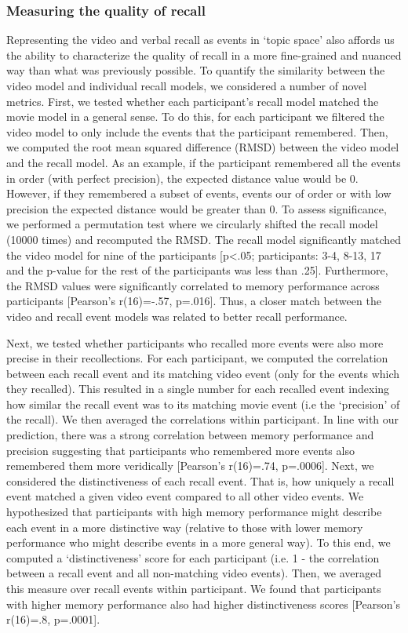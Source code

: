 \documentclass{article}
\begin{document}
{\subsubsection{Measuring the quality of recall}
Representing the video and verbal recall as events in `topic space' also affords us the ability to characterize the quality of recall in a more fine-grained and nuanced way than what was previously possible. To quantify the similarity between the video model and individual recall models, we considered a number of novel metrics.  First, we tested whether each participant's recall model matched the movie model in a general sense. To do this, for each participant we filtered the video model to only include the events that the participant remembered. Then, we computed the root mean squared difference (RMSD) between the video model and the recall model. As an example, if the participant remembered all the events in order (with perfect precision), the expected distance value would be 0. However, if they remembered a subset of events, events our of order or with low precision the expected distance would be greater than 0. To assess significance, we performed a permutation test where we circularly shifted the recall model (10000 times) and recomputed the RMSD. The recall model significantly matched the video model for nine of the participants [p<.05; participants: 3-4, 8-13, 17 and the p-value for the rest of the participants was less than .25]. Furthermore, the RMSD values were significantly correlated to memory performance across participants [Pearson's r(16)=-.57, p=.016]. Thus, a closer match between the video and recall event models was related to better recall performance.

Next, we tested whether participants who recalled more events were also more precise in their recollections. For each participant, we computed the correlation between each recall event and its matching video event (only for the events which they recalled). This resulted in a single number for each recalled event indexing how similar the recall event was to its matching movie event (i.e the `precision' of the recall). We then averaged the correlations within participant. In line with our prediction, there was a strong correlation between memory performance and precision suggesting that participants who remembered more events also remembered them more veridically [Pearson's r(16)=.74, p=.0006]. Next, we considered the distinctiveness of each recall event. That is, how uniquely a recall event matched a given video event compared to all other video events. We hypothesized that participants with high memory performance might describe each event in a more distinctive way (relative to those with lower memory performance who might describe events in a more general way). To this end, we computed a `distinctiveness' score for each participant (i.e. 1 - the correlation between a recall event and all non-matching video events).  Then, we averaged this measure over recall events within participant.  We found that participants with higher memory performance also had higher distinctiveness scores [Pearson's r(16)=.8, p=.0001].

}
\end{document}
